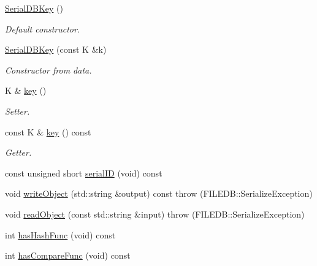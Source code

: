 \begin{DoxyCompactItemize}
\item 
\mbox{\hyperlink{classADATIO_1_1SerialDBKey_acaf28250dcc8a2b3944f7edef046df05}{Serial\+D\+B\+Key}} ()
\begin{DoxyCompactList}\small\item\em Default constructor. \end{DoxyCompactList}\item 
\mbox{\hyperlink{classADATIO_1_1SerialDBKey_ad035f1ac5d8565aec4e5a7197333123f}{Serial\+D\+B\+Key}} (const K \&k)
\begin{DoxyCompactList}\small\item\em Constructor from data. \end{DoxyCompactList}\item 
K \& \mbox{\hyperlink{classADATIO_1_1SerialDBKey_a9dc566bd8bc83d98d4438d220012648a}{key}} ()
\begin{DoxyCompactList}\small\item\em Setter. \end{DoxyCompactList}\item 
const K \& \mbox{\hyperlink{classADATIO_1_1SerialDBKey_a89514c7decfe6ee0573032faff49703a}{key}} () const
\begin{DoxyCompactList}\small\item\em Getter. \end{DoxyCompactList}\item 
const unsigned short \mbox{\hyperlink{classADATIO_1_1SerialDBKey_a0d088e08f453fd38a906208783f788d7}{serial\+ID}} (void) const
\item 
void \mbox{\hyperlink{classADATIO_1_1SerialDBKey_a6e2d9bbd18a3fa5e049f0ad5321d328a}{write\+Object}} (std\+::string \&output) const  throw (\+F\+I\+L\+E\+D\+B\+::\+Serialize\+Exception)
\item 
void \mbox{\hyperlink{classADATIO_1_1SerialDBKey_a10b5c24f2529bac1df4c4603c2caf551}{read\+Object}} (const std\+::string \&input)  throw (\+F\+I\+L\+E\+D\+B\+::\+Serialize\+Exception)
\item 
int \mbox{\hyperlink{classADATIO_1_1SerialDBKey_ae8926cd9bdef006f3729f4b724a2e2fe}{has\+Hash\+Func}} (void) const
\item 
int \mbox{\hyperlink{classADATIO_1_1SerialDBKey_a2f28d2ac39919d9cb9f6fc097944c49c}{has\+Compare\+Func}} (void) const
\end{DoxyCompactItemize}

